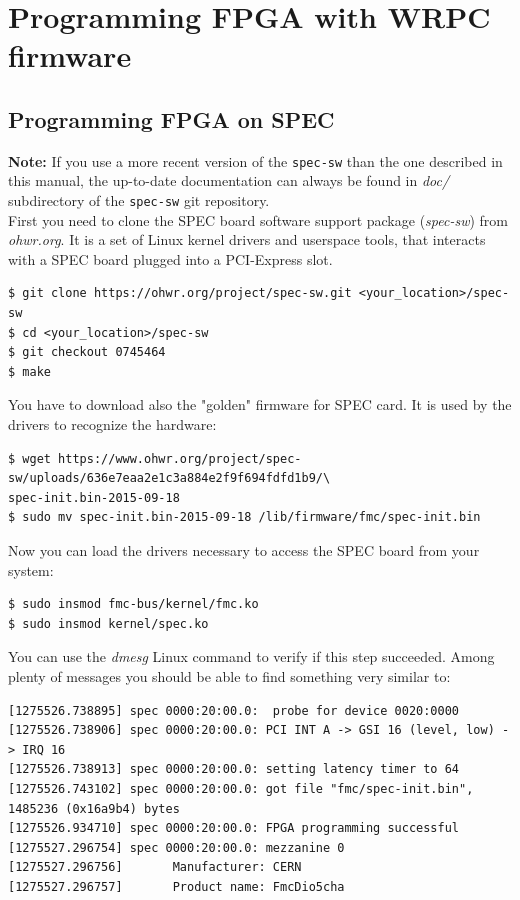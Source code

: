 \documentclass[a4paper, 12pt]{article}
\renewcommand{\_}{\underscore\allowbreak}
\begin{document}
\newpage
\section{Programming FPGA with WRPC firmware}
\label{Programming FPGA}

\subsection{Programming FPGA on SPEC}
\label{Programming FPGA on SPEC}

\textbf{Note:} If you use a more recent version of the \texttt{spec-sw} than the
one described in this manual, the up-to-date documentation can always be found
in \textit{doc/} subdirectory of the \texttt{spec-sw} git repository.\\

First you need to clone the SPEC board software support package
(\textit{spec-sw}) from \textit{ohwr.org}. It is a set of Linux kernel drivers and
userspace tools, that interacts with a SPEC board plugged into a PCI-Express
slot.\\

\begin{lstlisting}
$ git clone https://ohwr.org/project/spec-sw.git <your_location>/spec-sw
$ cd <your_location>/spec-sw
$ git checkout 0745464
$ make
\end{lstlisting}

You have to download also the "golden" firmware for SPEC card. It is used by
the drivers to recognize the hardware:
\begin{lstlisting}
$ wget https://www.ohwr.org/project/spec-sw/uploads/636e7eaa2e1c3a884e2f9f694fdfd1b9/\
spec-init.bin-2015-09-18
$ sudo mv spec-init.bin-2015-09-18 /lib/firmware/fmc/spec-init.bin
\end{lstlisting}

Now you can load the drivers necessary to access the SPEC board from your
system:
\begin{lstlisting}
$ sudo insmod fmc-bus/kernel/fmc.ko
$ sudo insmod kernel/spec.ko
\end{lstlisting}

You can use the \textit{dmesg} Linux command to verify if this step succeeded.
Among plenty of messages you should be able to find something very similar to:
\begin{lstlisting}[basicstyle=\scriptsize\ttfamily]
[1275526.738895] spec 0000:20:00.0:  probe for device 0020:0000
[1275526.738906] spec 0000:20:00.0: PCI INT A -> GSI 16 (level, low) -> IRQ 16
[1275526.738913] spec 0000:20:00.0: setting latency timer to 64
[1275526.743102] spec 0000:20:00.0: got file "fmc/spec-init.bin", 1485236 (0x16a9b4) bytes
[1275526.934710] spec 0000:20:00.0: FPGA programming successful
[1275527.296754] spec 0000:20:00.0: mezzanine 0
[1275527.296756]       Manufacturer: CERN
[1275527.296757]       Product name: FmcDio5cha
\end{lstlisting}
\end{document}
